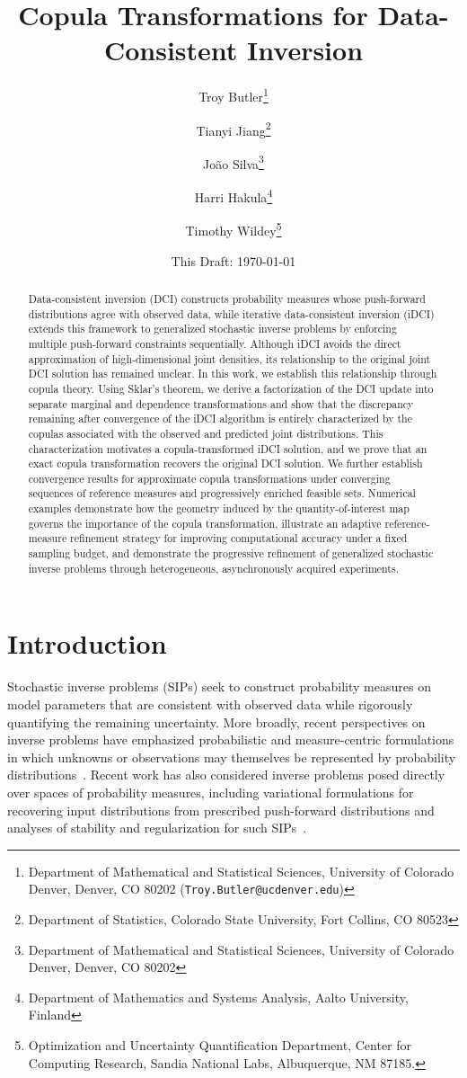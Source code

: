 \documentclass{article}
\title{Copula Transformations for Data-Consistent Inversion}
\author{Troy Butler\thanks{Department of Mathematical and Statistical Sciences, University of Colorado Denver, Denver, CO 80202 ({\tt Troy.Butler@ucdenver.edu})}
\and
Tianyi Jiang\thanks{Department of Statistics, Colorado State University, Fort Collins, CO 80523}
\and João Silva\thanks{Department of Mathematical and Statistical Sciences, University of Colorado Denver, Denver, CO 80202}
  \and
    Harri Hakula\thanks{Department of Mathematics and Systems Analysis, Aalto University, Finland}
    \and
    Timothy Wildey\thanks{Optimization and Uncertainty Quantification Department, Center for Computing Research, Sandia National Labs, Albuquerque, NM 87185.}
    }
\date{{\normalsize This Draft: \today}}
\newcounter{example}[section]
\begin{document}
\maketitle

\begin{abstract}
Data-consistent inversion (DCI) constructs probability measures whose push-forward distributions agree with observed data, while iterative data-consistent inversion (iDCI) extends this framework to generalized stochastic inverse problems by enforcing multiple push-forward constraints sequentially.
Although iDCI avoids the direct approximation of high-dimensional joint densities, its relationship to the original joint DCI solution has remained unclear.
In this work, we establish this relationship through copula theory.
Using Sklar's theorem, we derive a factorization of the DCI update into separate marginal and dependence transformations and show that the discrepancy remaining after convergence of the iDCI algorithm is entirely characterized by the copulas associated with the observed and predicted joint distributions.
This characterization motivates a copula-transformed iDCI solution, and we prove that an exact copula transformation recovers the original DCI solution.
We further establish convergence results for approximate copula transformations under converging sequences of reference measures and progressively enriched feasible sets.
Numerical examples demonstrate how the geometry induced by the quantity-of-interest map governs the importance of the copula transformation, illustrate an adaptive reference-measure refinement strategy for improving computational accuracy under a fixed sampling budget, and demonstrate the progressive refinement of generalized stochastic inverse problems through heterogeneous, asynchronously acquired experiments.
\end{abstract}

\section{Introduction}

Stochastic inverse problems (SIPs) seek to construct probability measures on model parameters that are consistent with observed data while rigorously quantifying the remaining uncertainty.
More broadly, recent perspectives on inverse problems have emphasized probabilistic and measure-centric formulations in which unknowns or
observations may themselves be represented by probability distributions~\cite{NELSEN2026253}.
Recent work has also considered inverse problems posed directly over spaces of probability measures, including variational formulations for recovering input distributions from prescribed push-forward distributions and analyses of stability and regularization for such
SIPs~\cite{LOW+24, LOW+25}.
\end{document}
